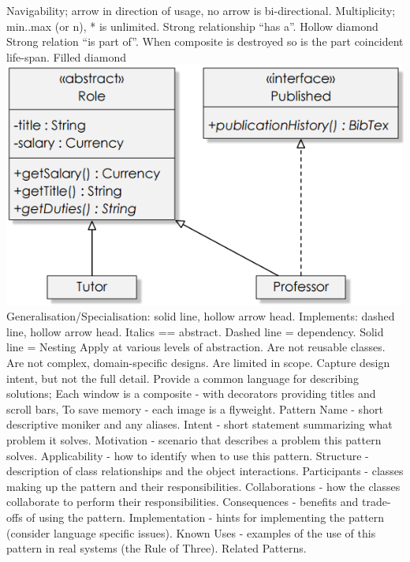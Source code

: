 \documentclass[number]{assignment}
\begin{document}
\begin{landscape}
\begin{multicols}{3}
Navigability; arrow in direction of usage, no arrow is bi-directional. Multiplicity; min..max (or n), * is unlimited.
Strong relationship ``has a''. Hollow diamond
Strong relation ``is part of''. When composite is destroyed so is the part coincident life-span. Filled diamond
\includegraphics[width=\linewidth]{inheritance.png}
Generalisation/Specialisation: solid line, hollow arrow head. Implements: dashed line, hollow arrow head. Italics == abstract.
Dashed line = dependency. Solid line = Nesting
Apply at various levels of abstraction. Are not reusable classes. Are not complex, domain-specific designs. Are limited in scope. Capture design intent, but not the full detail.
Provide a common language for describing solutions; Each window is a composite - with decorators providing titles and scroll bars, To save memory - each image is a flyweight.
Pattern Name - short descriptive moniker and any aliases. Intent - short statement summarizing what problem it solves. Motivation - scenario that describes a problem this pattern solves. Applicability - how to identify when to use this pattern. Structure - description of class relationships and the object interactions. Participants - classes making up the pattern and their responsibilities. Collaborations - how the classes collaborate to perform their responsibilities. Consequences - benefits and trade-offs of using the pattern. Implementation - hints for implementing the pattern (consider language specific issues). Known Uses - examples of the use of this pattern in real systems (the Rule of Three). Related Patterns.

\end{multicols}
\end{landscape}
\end{document}
